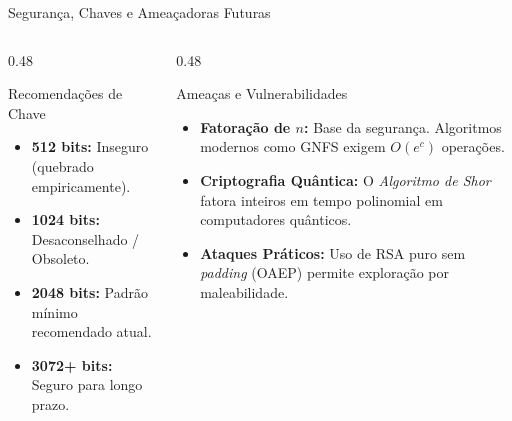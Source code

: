 \documentclass[aspectratio=169, 10pt]{beamer}
\begin{document}
\begin{frame}{Segurança, Chaves e Ameaçadoras Futuras}
    \begin{columns}[T]
        \begin{column}{0.48\textwidth}
            \begin{block}{Recomendações de Chave}
                \begin{itemize}
                    \item \textbf{512 bits:} Inseguro (quebrado empiricamente).
                    \item \textbf{1024 bits:} Desaconselhado / Obsoleto.
                    \item \textbf{2048 bits:} Padrão mínimo recomendado atual.
                    \item \textbf{3072+ bits:} Seguro para longo prazo.
                \end{itemize}
            \end{block}
        \end{column}
        \begin{column}{0.48\textwidth}
            \begin{block}{Ameaças e Vulnerabilidades}
                \begin{itemize}
                    \item \textbf{Fatoração de $n$:} Base da segurança. Algoritmos modernos como GNFS exigem $O(e^c)$ operações.
                    \item \textbf{Criptografia Quântica:} O \textit{Algoritmo de Shor} fatora inteiros em tempo polinomial em computadores quânticos.
                    \item \textbf{Ataques Práticos:} Uso de RSA puro sem \textit{padding} (OAEP) permite exploração por maleabilidade.
                \end{itemize}
            \end{block}
        \end{column}
    \end{columns}
\end{frame}
\end{document}
